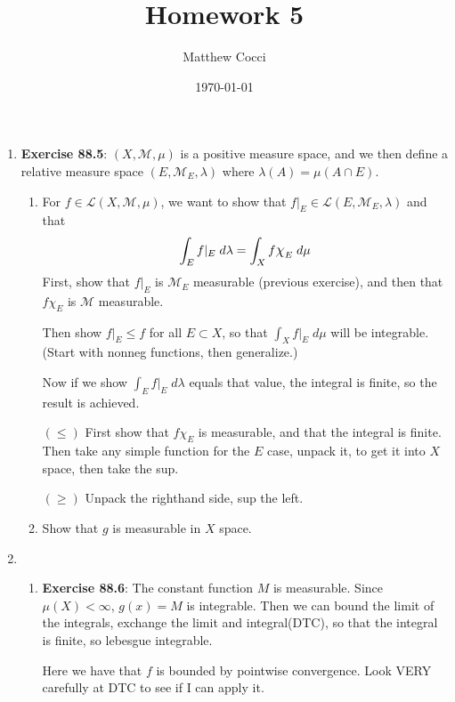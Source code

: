 \documentclass[12pt]{article}
\author{Matthew Cocci}
\title{\textbf{Homework 5}}
\date{\today}
\theoremstyle{plain}
\theoremstyle{definition}
\theoremstyle{remark}
\newcommand*{\Chi}{\mbox{\large$\chi$}} %
\begin{document}
\maketitle 

\begin{enumerate} 

\item \textbf{Exercise 88.5}: $(X,\mathscr{M},\mu)$ is a positive measure space, and we then define a relative measure space $(E,\mathscr{M}_E,\lambda)$ where $\lambda(A)=\mu(A\cap E)$.

\begin{enumerate}
\item For $f\in\mathscr{L}(X,\mathscr{M},\mu)$, we want to show that $f|_E \in\mathscr{L}(E,\mathscr{M}_E,\lambda)$ and that
\[
    \int_E f|_E \; d\lambda = \int_X f \Chi_E\; d\mu
\]
First, show that $f|_E$ is $\mathscr{M}_E$ measurable (previous exercise), and then that $f\chi_E$ is $\mathscr{M}$ measurable.

Then show $f|_E \leq f$ for all $E\subset X$, so that $\int_X f|_E \; d\mu$ will be integrable. (Start with nonneg functions, then generalize.) 

Now if we show $\int_E f|_E \; d\lambda$ equals that value, the integral is finite, so the result is achieved.

$(\leq)$ First show that $f\chi_E$ is measurable, and that the integral is finite. Then take any simple function for the $E$ case, unpack it, to get it into $X$ space, then take the sup.

$(\geq)$ Unpack the righthand side, sup the left.

\item Show that $g$ is measurable in $X$ space.  

\end{enumerate}

\item 

\begin{enumerate} 
        

\item \textbf{Exercise 88.6}: The constant function $M$ is measurable. Since $\mu(X)<\infty$, $g(x)=M$ is integrable. Then we can bound the limit of the integrals, exchange the limit and integral(DTC), so that the integral is finite, so lebesgue integrable.

Here we have that $f$ is bounded by pointwise convergence. Look VERY carefully at DTC to see if I can apply it.


\end{enumerate}
\end{enumerate}
\end{document}
